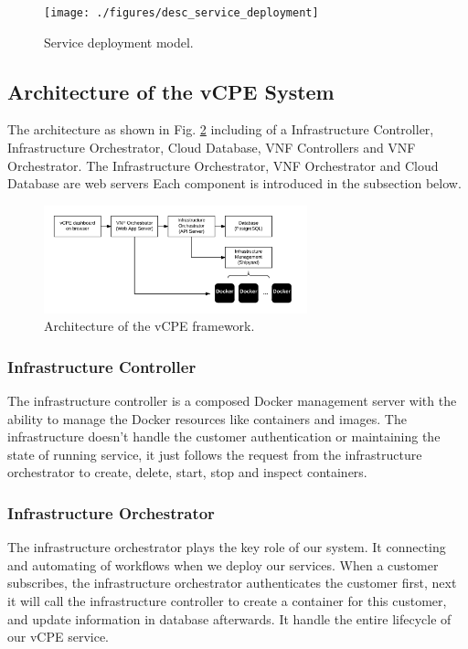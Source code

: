 \documentclass[journal]{IEEEtran}
\begin{document}
\begin{figure}[!t]
\centering
\texttt{[image: ./figures/desc\_service\_deployment]}
\caption{Service deployment model.}
\label{fig:desc_service_deployment}
\end{figure}



\subsection{Architecture of the vCPE System}
The architecture as shown in Fig. \ref{fig:desc_vcpe_framework} including of a Infrastructure Controller, Infrastructure Orchestrator, Cloud Database, VNF Controllers and VNF Orchestrator.
The Infrastructure Orchestrator, VNF Orchestrator and Cloud Database are web servers
Each component is introduced in the subsection below.

\begin{figure}[!t]
\centering
\includegraphics[width=3in]{./figures/desc_vcpe_framework}
\caption{Architecture of the vCPE framework.}
\label{fig:desc_vcpe_framework}
\end{figure}

\subsubsection{Infrastructure Controller}

The infrastructure controller is a composed Docker management server with the ability to manage the Docker resources like containers and images. The infrastructure doesn't handle the customer authentication or maintaining the state of running service, it just follows the request from the infrastructure orchestrator to create, delete, start, stop and inspect containers.

\subsubsection{Infrastructure Orchestrator}

The infrastructure orchestrator plays the key role of our system. It connecting and automating of workflows when we deploy our services. When a customer subscribes, the infrastructure orchestrator authenticates the customer first, next it will call the infrastructure controller to create a container for this customer, and update information in database afterwards. It handle the entire lifecycle of our vCPE service.
\end{document}
